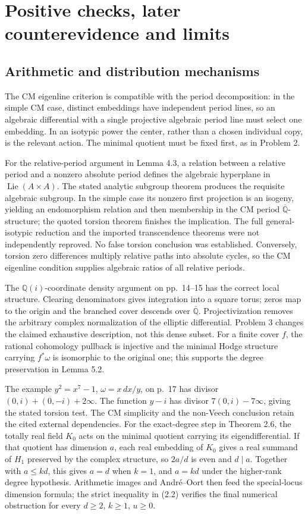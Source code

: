 \documentclass[10pt]{article}
\begin{document}
\section*{Positive checks, later counterevidence and limits}
\subsection*{Arithmetic and distribution mechanisms}
The CM eigenline criterion is compatible with the period decomposition: in the simple CM case, distinct embeddings have independent period lines, so an algebraic differential with a single projective algebraic period line must select one embedding. In an isotypic power the center, rather than a chosen individual copy, is the relevant action. The minimal quotient must be fixed first, as in Problem 2.\par
For the relative-period argument in Lemma 4.3, a relation between a relative period and a nonzero absolute period defines the algebraic hyperplane in \(\operatorname{Lie}(A\times A)\). The stated analytic subgroup theorem produces the requisite algebraic subgroup. In the simple case its nonzero first projection is an isogeny, yielding an endomorphism relation and then membership in the CM period \(\overline{\mathbb Q}\)-structure; the quoted torsion theorem finishes the implication. The full general-isotypic reduction and the imported transcendence theorems were not independently reproved. No false torsion conclusion was established. Conversely, torsion zero differences multiply relative paths into absolute cycles, so the CM eigenline condition supplies algebraic ratios of all relative periods.\par
The \(\mathbb Q(i)\)-coordinate density argument on pp. 14–15 has the correct local structure. Clearing denominators gives integration into a square torus; zeros map to the origin and the branched cover descends over \(\overline{\mathbb Q}\). Projectivization removes the arbitrary complex normalization of the elliptic differential. Problem 3 changes the claimed exhaustive description, not this dense subset. For a finite cover \(f\), the rational cohomology pullback is injective and the minimal Hodge structure carrying \(f^*\omega\) is isomorphic to the original one; this supports the degree preservation in Lemma 5.2.\par
The example \(y^2=x^7-1\), \(\omega=x\,dx/y\), on p. 17 has divisor \((0,i)+(0,-i)+2\infty\). The function \(y-i\) has divisor \(7(0,i)-7\infty\), giving the stated torsion test. The CM simplicity and the non-Veech conclusion retain the cited external dependencies. For the exact-degree step in Theorem 2.6, the totally real field \(K_0\) acts on the minimal quotient carrying its eigendifferential. If that quotient has dimension \(a\), each real embedding of \(K_0\) gives a real summand of \(H_1\) preserved by the complex structure, so \(2a/d\) is even and \(d\mid a\). Together with \(a\le kd\), this gives \(a=d\) when \(k=1\), and \(a=kd\) under the higher-rank degree hypothesis. Arithmetic images and André–Oort then feed the special-locus dimension formula; the strict inequality in (2.2) verifies the final numerical obstruction for every \(d\ge2\), \(k\ge1\), \(u\ge0\).\par
\end{document}
